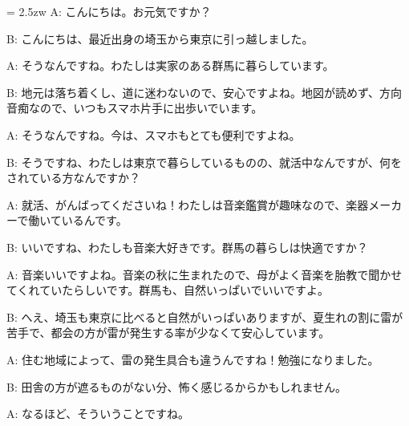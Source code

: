 \documentclass[11pt]{amsart}
\title{}
\author{}
\newenvironment{hangall}[1]{\hangindent = 2.5zw\everypar{\hangindent = 2.5zw}}{}
\begin{document}
\maketitle
\begin{hangall}{}%
A: こんにちは。お元気ですか？

B: こんにちは、最近出身の埼玉から東京に引っ越しました。

A: そうなんですね。わたしは実家のある群馬に暮らしています。

B: 地元は落ち着くし、道に迷わないので、安心ですよね。地図が読めず、方向音痴なので、いつもスマホ片手に出歩いでいます。

A: そうなんですね。今は、スマホもとても便利ですよね。

B: そうですね、わたしは東京で暮らしているものの、就活中なんですが、何をされている方なんですか？

A: 就活、がんばってくださいね！わたしは音楽鑑賞が趣味なので、楽器メーカーで働いているんです。

B: いいですね、わたしも音楽大好きです。群馬の暮らしは快適ですか？

A: 音楽いいですよね。音楽の秋に生まれたので、母がよく音楽を胎教で聞かせてくれていたらしいです。群馬も、自然いっぱいでいいですよ。

B: へえ、埼玉も東京に比べると自然がいっぱいありますが、夏生れの割に雷が苦手で、都会の方が雷が発生する率が少なくて安心しています。

A: 住む地域によって、雷の発生具合も違うんですね！勉強になりました。

B: 田舎の方が遮るものがない分、怖く感じるからかもしれません。

A: なるほど、そういうことですね。
\end{hangall}
\end{document}
